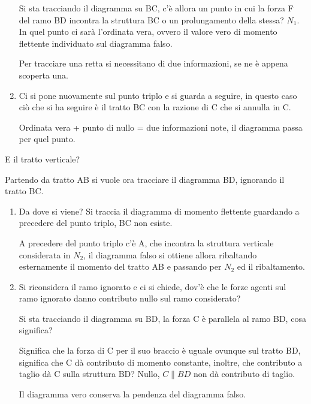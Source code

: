 \documentclass{article}
\begin{document}
\begin{adjustwidth}{2in}{}
\begin{enumerate}
		Si sta tracciando il diagramma su BC, c'è allora un punto in cui la forza F del ramo BD incontra la struttura BC o un prolungamento della stessa? $N_1$. In quel punto ci sarà l'ordinata vera, ovvero il valore vero di momento flettente individuato sul diagramma falso. \newline 
		
		Per tracciare una retta si necessitano di due informazioni, se ne è appena scoperta una. 
		
		\item Ci si pone nuovamente sul punto triplo e si guarda a seguire, in questo caso ciò che si ha seguire è il tratto BC con la razione di C che si annulla in C. \newline 
		
		Ordinata vera + punto di nullo = due informazioni note, il diagramma passa per quel punto. 
	\end{enumerate}

	E il tratto verticale? 
	
	Partendo da tratto AB si vuole ora tracciare il diagramma BD, ignorando il tratto BC. 
	
	\begin{enumerate}
		\item Da dove si viene? Si traccia il diagramma di momento flettente guardando a precedere del punto triplo, BC non esiste. 
		
		A precedere del punto triplo c'è A, che incontra la struttura verticale considerata in $N_2$, il diagramma falso si ottiene allora ribaltando esternamente il momento del tratto AB e passando per $N_2$ ed il ribaltamento. 
		
		\item Si riconsidera il ramo ignorato e ci si chiede, dov'è che le forze agenti sul ramo ignorato danno contributo nullo sul ramo considerato? \newline 
		
		Si sta tracciando il diagramma su BD, la forza C è parallela al ramo BD, cosa significa?
		
		Significa che la forza di C per il suo braccio è uguale ovunque sul tratto BD, significa che C dà contributo di momento constante, inoltre, che contributo a taglio dà C sulla struttura BD? Nullo, $C\parallel BD$ non dà contributo di taglio. \newline 
		  
		Il diagramma vero conserva la pendenza del diagramma falso. \newline 
		

\end{enumerate}
\end{adjustwidth}
\end{document}
